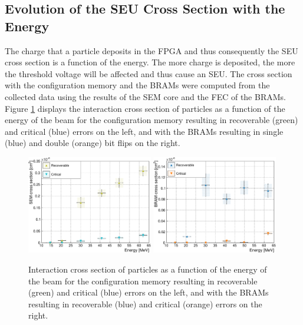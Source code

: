     \subsection{Evolution of the SEU Cross Section with the Energy}

      The charge that a particle deposits in the FPGA and thus consequently the SEU cross section is a function of the energy. The more charge is deposited, the more the threshold voltage will be affected and thus cause an SEU. The cross section with the configuration memory and the BRAMs were computed from the collected data using the results of the SEM core and the FEC of the BRAMs. Figure \ref{fig:II-5-data-seu-energy} displays the interaction cross section of particles as a function of the energy of the beam for the configuration memory resulting in recoverable (green) and critical (blue) errors on the left, and with the BRAMs resulting in single (blue) and double (orange) bit flips on the right. \\

      \begin{figure}[h!]
        \centering
        \includegraphics[width=0.49\textwidth]{img/plots/cE_SEM-crop}
        \includegraphics[width=0.49\textwidth]{img/plots/cE_BRAM-crop}
        \caption{Interaction cross section of particles as a function of the energy of the beam for the configuration memory resulting in recoverable (green) and critical (blue) errors on the left, and with the BRAMs resulting in recoverable (blue) and critical (orange) errors on the right.}
        \label{fig:II-5-data-seu-energy}
      \end{figure}

